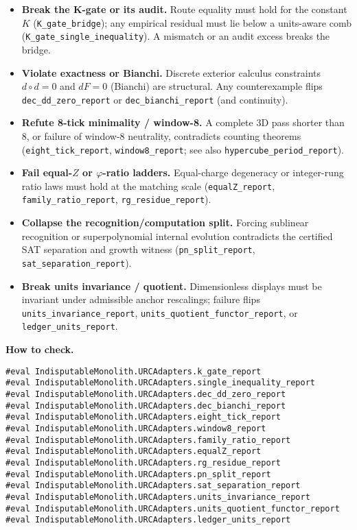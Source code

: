 \documentclass[11pt,a4paper,twoside]{article}
\numberwithin{equation}{section}
\newcommand{\phigr}{\varphi} %
\theoremstyle{customthm}
\theoremstyle{customdef}
\theoremstyle{customrem}
\begin{document}
\begin{itemize}[leftmargin=*]
  \item \textbf{Break the K-gate or its audit.} Route equality must hold for the constant \(K\) (\texttt{K\_gate\_bridge}); any empirical residual must lie below a units-aware comb (\texttt{K\_gate\_single\_inequality}). A mismatch or an audit excess breaks the bridge.
  \item \textbf{Violate exactness or Bianchi.} Discrete exterior calculus constraints \(d\circ d=0\) and \(dF=0\) (Bianchi) are structural. Any counterexample flips \texttt{dec\_dd\_zero\_report} or \texttt{dec\_bianchi\_report} (and continuity).
  \item \textbf{Refute 8-tick minimality / window-8.} A complete 3D pass shorter than 8, or failure of window-8 neutrality, contradicts counting theorems (\texttt{eight\_tick\_report}, \texttt{window8\_report}; see also \texttt{hypercube\_period\_report}).
  \item \textbf{Fail equal-\(Z\) or \(\phigr\)-ratio ladders.} Equal-charge degeneracy or integer-rung ratio laws must hold at the matching scale (\texttt{equalZ\_report}, \texttt{family\_ratio\_report}, \texttt{rg\_residue\_report}).
  \item \textbf{Collapse the recognition/computation split.} Forcing sublinear recognition or superpolynomial internal evolution contradicts the certified SAT separation and growth witness (\texttt{pn\_split\_report}, \texttt{sat\_separation\_report}).
  \item \textbf{Break units invariance / quotient.} Dimensionless displays must be invariant under admissible anchor rescalings; failure flips \texttt{units\_invariance\_report}, \texttt{units\_quotient\_functor\_report}, or \texttt{ledger\_units\_report}.
\end{itemize}

\noindent\textbf{How to check.}
\begin{lstlisting}
#eval IndisputableMonolith.URCAdapters.k_gate_report
#eval IndisputableMonolith.URCAdapters.single_inequality_report
#eval IndisputableMonolith.URCAdapters.dec_dd_zero_report
#eval IndisputableMonolith.URCAdapters.dec_bianchi_report
#eval IndisputableMonolith.URCAdapters.eight_tick_report
#eval IndisputableMonolith.URCAdapters.window8_report
#eval IndisputableMonolith.URCAdapters.family_ratio_report
#eval IndisputableMonolith.URCAdapters.equalZ_report
#eval IndisputableMonolith.URCAdapters.rg_residue_report
#eval IndisputableMonolith.URCAdapters.pn_split_report
#eval IndisputableMonolith.URCAdapters.sat_separation_report
#eval IndisputableMonolith.URCAdapters.units_invariance_report
#eval IndisputableMonolith.URCAdapters.units_quotient_functor_report
#eval IndisputableMonolith.URCAdapters.ledger_units_report
\end{lstlisting}
\end{document}
